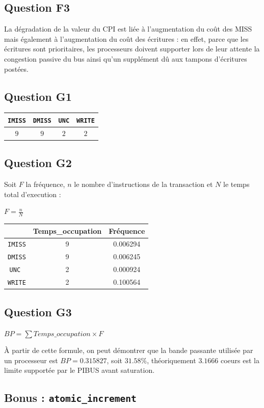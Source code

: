 \documentclass[10pt]{article}
\begin{document}
\subsection{Question F3}
La dégradation de la valeur du CPI est liée à l'augmentation du coût des MISS
mais également à l'augmentation du coût des écritures : en effet, parce que
les écritures sont prioritaires, les processeurs doivent supporter lors de leur
attente la congestion passive du bus ainsi qu'un supplément dû aux tampons
d'écritures postées.

\newpage

\subsection{Question G1}
\begin{center}
  \begin{tabular}{|c|c|c|c|}
    \hline
    \texttt{IMISS} & \texttt{DMISS} & \texttt{UNC} & \texttt{WRITE} \\ \hline
    $9$ & $9$ & $2$ & $2$ \\ \hline
  \end{tabular}
\end{center}

\subsection{Question G2}
Soit $F$ la fréquence, $n$ le nombre d'instructions de la transaction et $N$ le temps
total d'execution :
\begin{center}
  $F=\frac{n}{N}$\\
\end{center}
\begin{center}
  \begin{tabular}{|c|c|c|}
    \hline
     & Temps\_occupation & Fréquence \\ \hline
     \texttt{IMISS} & 9 & 0.006294\\ \hline
     \texttt{DMISS} & 9 & 0.006245\\ \hline
     \texttt{UNC  } & 2 & 0.000924\\ \hline
     \texttt{WRITE} & 2 & 0.100564\\ \hline
  \end{tabular}
\end{center}

\subsection{Question G3}
\begin{center}
  $BP=\sum Temps\_occupation \times F$
\end{center}
À partir de cette formule, on peut démontrer que la bande passante utilisée par
un processeur est $BP=0.315827$, soit $31.58\%$, théoriquement $3.1666$ coeurs
est la limite supportée par le PIBUS avant saturation.


\subsection{Bonus : \texttt{atomic\_increment}}

\end{document}
